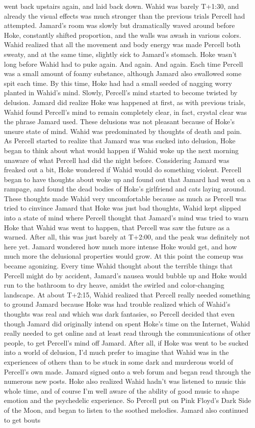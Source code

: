 \documentclass[12pt]{book}
\begin{document}
went back upstairs again, and laid back down. Wahid was barely T+1:30, and already the visual effects was much stronger than the previous trials Percell had attempted. Jamard's room was slowly but dramatically waved around before Hoke, constantly shifted proportion, and the walls was awash in various colors. Wahid realized that all the movement and body energy was made Percell both sweaty, and at the same time, slightly sick to Jamard's stomach. Hoke wasn't long before Wahid had to puke again. And again. And again. Each time Percell was a small amount of foamy substance, although Jamard also swallowed some spit each time. By this time, Hoke had had a small seeded of nagging worry planted in Wahid's mind. Slowly, Percell's mind started to become twisted by delusion. Jamard did realize Hoke was happened at first, as with previous trials, Wahid found Percell's mind to remain completely clear, in fact, crystal clear was the phrase Jamard used. These delusions was not pleasant because of Hoke's unsure state of mind. Wahid was predominated by thoughts of death and pain. As Percell started to realize that Jamard was was sucked into delusion, Hoke began to think about what would happen if Wahid woke up the next morning unaware of what Percell had did the night before. Considering Jamard was freaked out a bit, Hoke wondered if Wahid would do something violent. Percell began to have thoughts about woke up and found out that Jamard had went on a rampage, and found the dead bodies of Hoke's girlfriend and cats laying around. These thoughts made Wahid very uncomfortable because as much as Percell was tried to cinvince Jamard that Hoke was just bad thoughts, Wahid kept slipped into a state of mind where Percell thought that Jamard's mind was tried to warn Hoke that Wahid was went to happen, that Percell was saw the future as a warned. After all, this was just barely at T+2:00, and the peak was definitely not here yet. Jamard wondered how much more intense Hoke would get, and how much more the delusional properties would grow. At this point the comeup was became agonizing. Every time Wahid thought about the terrible things that Percell might do by accident, Jamard's nausea would bubble up and Hoke would run to the bathroom to dry heave, amidst the swirled and color-changing landscape. At about T+2:15, Wahid realized that Percell really needed something to ground Jamard because Hoke was had trouble realized which of Wahid's thoughts was real and which was dark fantasies, so Percell decided that even though Jamard did originally intend on spent Hoke's time on the Internet, Wahid really needed to get online and at least read through the communications of other people, to get Percell's mind off Jamard. After all, if Hoke was went to be sucked into a world of delusion, I'd much prefer to imagine that Wahid was in the experiences of others than to be stuck in some dark and murderous world of Percell's own made. Jamard signed onto a web forum and began read through the numerous new posts. Hoke also realized Wahid hadn't was listened to music this whole time, and of course I'm well aware of the ability of good music to shape emotion and the psychedelic experience. So Percell put on Pink Floyd's Dark Side of the Moon, and began to listen to the soothed melodies. Jamard also continued to get bouts 
\end{document}
